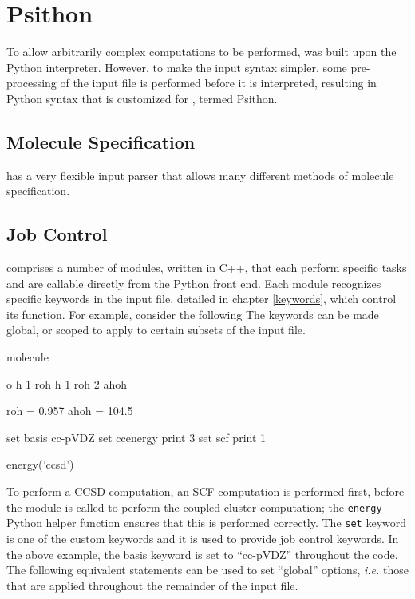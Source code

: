 \section{Psithon} \label{psithon} 
To allow arbitrarily complex computations to be performed, \PSIfour was built
upon the Python interpreter.  However, to make the input syntax simpler, some
pre-processing of the input file is performed before it is interpreted,
resulting in Python syntax that is customized for \PSI, termed Psithon.

\subsection{Molecule Specification}

\PSIfour has a very flexible input parser that allows many different methods of
molecule specification.  

\subsection{Job Control}

\PSI comprises a number of modules, written in C++, that each perform specific
tasks and are callable directly from the Python front end.  Each module
recognizes specific keywords in the input file, detailed in chapter
\ref{keywords}, which control its function.  For example, consider the
following The keywords can be made global, or scoped to apply to certain
subsets of the input file.

\begin{Snippet}
molecule {
  o
  h 1 roh
  h 1 roh 2 ahoh

  roh = 0.957
  ahoh = 104.5
}

set basis cc-pVDZ
set ccenergy print 3
set scf print 1

energy('ccsd')
\end{Snippet}

To perform a CCSD computation, an SCF computation is performed first, before
the \PSIccenergy module is called to perform the coupled cluster computation;
the {\tt energy} Python helper function ensures that this is performed
correctly.  The {\tt set} keyword is one of the custom \PSI keywords and it is
used to provide job control keywords.  In the above example, the basis keyword
is set to ``cc-pVDZ'' throughout the code.  The following equivalent statements
can be used to set ``global'' options, {\it i.e.} those that are applied
throughout the remainder of the input file.

